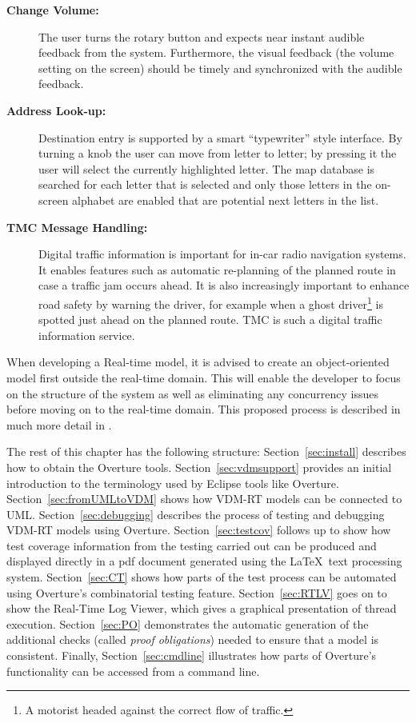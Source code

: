 \begin{description}
\item[\textbf{Change Volume:}] The user turns the rotary button and expects near instant audible feedback from the system. Furthermore, the visual feedback
(the volume setting on the screen) should be timely and synchronized with the
audible feedback.
\item[\textbf{Address Look-up:}] Destination entry is supported by a smart ``typewriter'' style interface. By turning a knob the user can move from letter to letter; by pressing it the user will select the currently highlighted letter. The map database is searched for each letter that is selected and only those letters in the on-screen alphabet are enabled that are potential next letters in the list.
\item[\textbf{TMC Message Handling:}] Digital traffic information is important for in-car radio navigation systems. It enables features such as automatic re-planning of the planned route in case a traffic jam occurs ahead. It is also increasingly important to enhance road safety by warning the driver, for example when a ghost driver\footnote{A motorist headed against the correct flow of traffic.} is spotted just ahead on the planned route. TMC is such a digital traffic information service.
\end{description}

When developing a Real-time model, it is advised to create an object-oriented model first outside the real-time domain. This will enable the developer to focus on the structure of the system as well as eliminating any concurrency issues before moving on to the real-time domain. This proposed process is described in much more detail in \cite{Larsen&09b}.

The rest of this chapter has the following structure: Section~\ref{sec:install} describes how to obtain the Overture tools.
Section~\ref{sec:vdmsupport} provides an initial introduction to the
terminology used by Eclipse tools like Overture. 
Section~\ref{sec:fromUMLtoVDM} shows how VDM-RT models can be
connected to UML.
Section~\ref{sec:debugging} describes the process of testing and
debugging VDM-RT models using Overture.
Section~\ref{sec:testcov} follows up to show how test coverage
information from the testing carried out can be produced and displayed
directly in a pdf document generated using the \LaTeX\ text processing
system. 
Section~\ref{sec:CT} shows how parts of the test process can be
automated using Overture's combinatorial testing feature.
 Section~\ref{sec:RTLV} goes on
to show the Real-Time Log Viewer, which gives a graphical presentation
of thread execution.
Section~\ref{sec:PO} demonstrates the automatic generation of the
additional checks (called \emph{proof obligations}) needed to ensure
that a model is consistent.  Finally, Section~\ref{sec:cmdline}
illustrates how parts of Overture's functionality can be accessed from
a command line.

